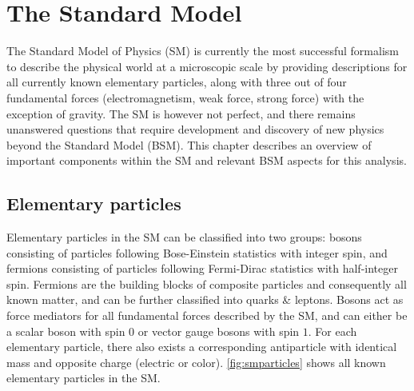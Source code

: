 \documentclass[../thesis.tex]{subfiles}
\begin{document}
\vspace{-1\baselineskip}

\section{The Standard Model}
\label{sec:SM}
The Standard Model of Physics (\acs{SM}) \citep{theory:SM} is currently the most successful formalism to describe the physical world at a microscopic scale by providing descriptions for all currently known elementary particles, along with three out of four fundamental forces (electromagnetism, weak force, strong force) with the exception of gravity. The \acs{SM} is however not perfect, and there remains unanswered questions that require development and discovery of new physics beyond the Standard Model (\acs{BSM}). This chapter describes an overview of important components within the \acs{SM} and relevant \acs{BSM} aspects for this analysis.

\subsection{Elementary particles}
Elementary particles in the \acs{SM} can be classified into two groups: bosons consisting of particles following Bose-Einstein statistics with integer spin, and fermions consisting of particles following Fermi-Dirac statistics with half-integer spin. Fermions are the building blocks of composite particles and consequently all known matter, and can be further classified into quarks \& leptons. Bosons act as force mediators for all fundamental forces described by the \acs{SM}, and can either be a scalar boson with spin $0$ or vector gauge bosons with spin $1$. For each elementary particle, there also exists a corresponding antiparticle with identical mass and opposite charge (electric or color). \autoref{fig:smparticles} shows all known elementary particles in the \acs{SM}.
\end{document}
